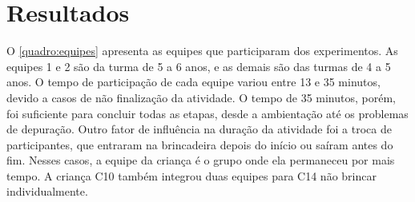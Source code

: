 \chapter{Resultados}
\label{c_resultados}


O \autoref{quadro:equipes} apresenta as equipes que participaram dos experimentos. As equipes 1 e 2 são da turma de 5 a 6 anos, e as demais são das turmas de 4 a 5 anos. O tempo de participação de cada equipe variou entre 13 e 35 minutos, devido a casos de não finalização da atividade. O tempo de 35 minutos, porém, foi suficiente para concluir todas as etapas, desde a ambientação até os problemas de depuração. Outro fator de influência na duração da atividade foi a troca de participantes, que entraram na brincadeira depois do início ou saíram antes do fim. Nesses casos, a equipe da criança é o grupo onde ela permaneceu por mais tempo. A criança C10 também integrou duas equipes para C14 não brincar individualmente.

